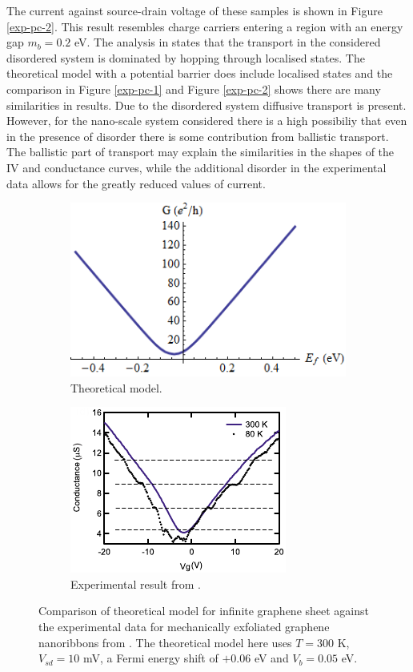 		The current against source-drain voltage of these samples is shown in Figure \ref{exp-pc-2}. This result resembles charge carriers entering a region with an energy gap $m_{b}=0.2$ eV. The analysis in \cite{b21} states that the transport in the considered disordered system is dominated by hopping through localised states. The theoretical model with a potential barrier does include localised states and the comparison in Figure \ref{exp-pc-1} and Figure \ref{exp-pc-2} shows there are many similarities in results. Due to the disordered system diffusive transport is present. However, for the nano-scale system considered there is a high possibiliy that even in the presence of disorder there is some contribution from ballistic transport. The ballistic part of transport may explain the similarities in the shapes of the IV and conductance curves, while the additional disorder in the experimental data allows for the greatly reduced values of current.

		\begin{figure}[h]
			\begin{subfigure}{0.45\textwidth}
				\centerline{\includegraphics[scale=0.5]{images/exp-d-1}}
				\caption{Theoretical model.}
			\end{subfigure}
			\hspace{1cm}
			\begin{subfigure}{0.45\textwidth}
				\centerline{\includegraphics[scale=0.8]{images/exp-pd-1}}
				\caption{Experimental result from \cite{b22}.}
			\end{subfigure}
			\caption{Comparison of theoretical model for infinite graphene sheet against the experimental data for mechanically exfoliated graphene nanoribbons from \cite{b22}. The theoretical model here uses $T=300$ K, $V_{sd}=10$ mV, a Fermi energy shift of $+0.06$ eV and $V_{b}=0.05$ eV.}
			\label{exp-pd-1}
		\end{figure}
		
